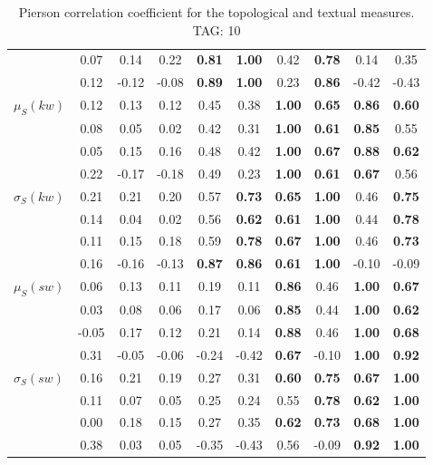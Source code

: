 \begin{table*}[h!]
\begin{center}
\begin{tabular}{| l || c | c | c | c | c | c | c | c | c |}
 & 0.07 & 0.14 & 0.22 & {\bf 0.81} & {\bf 1.00} & 0.42 & {\bf 0.78} & 0.14 & 0.35 \\
 & 0.12 & -0.12 & -0.08 & {\bf 0.89} & {\bf 1.00} & 0.23 & {\bf 0.86} & -0.42 & -0.43 \\\hline
$\mu_S(kw)$ & 0.12 & 0.13 & 0.12 & 0.45 & 0.38 & {\bf 1.00} & {\bf 0.65} & {\bf 0.86} & {\bf 0.60} \\
 & 0.08 & 0.05 & 0.02 & 0.42 & 0.31 & {\bf 1.00} & {\bf 0.61} & {\bf 0.85} & 0.55 \\
 & 0.05 & 0.15 & 0.16 & 0.48 & 0.42 & {\bf 1.00} & {\bf 0.67} & {\bf 0.88} & {\bf 0.62} \\
 & 0.22 & -0.17 & -0.18 & 0.49 & 0.23 & {\bf 1.00} & {\bf 0.61} & {\bf 0.67} & 0.56 \\\hline
$\sigma_S(kw)$ & 0.21 & 0.21 & 0.20 & 0.57 & {\bf 0.73} & {\bf 0.65} & {\bf 1.00} & 0.46 & {\bf 0.75} \\
 & 0.14 & 0.04 & 0.02 & 0.56 & {\bf 0.62} & {\bf 0.61} & {\bf 1.00} & 0.44 & {\bf 0.78} \\
 & 0.11 & 0.15 & 0.18 & 0.59 & {\bf 0.78} & {\bf 0.67} & {\bf 1.00} & 0.46 & {\bf 0.73} \\
 & 0.16 & -0.16 & -0.13 & {\bf 0.87} & {\bf 0.86} & {\bf 0.61} & {\bf 1.00} & -0.10 & -0.09 \\\hline
$\mu_S(sw)$ & 0.06 & 0.13 & 0.11 & 0.19 & 0.11 & {\bf 0.86} & 0.46 & {\bf 1.00} & {\bf 0.67} \\
 & 0.03 & 0.08 & 0.06 & 0.17 & 0.06 & {\bf 0.85} & 0.44 & {\bf 1.00} & {\bf 0.62} \\
 & -0.05 & 0.17 & 0.12 & 0.21 & 0.14 & {\bf 0.88} & 0.46 & {\bf 1.00} & {\bf 0.68} \\
 & 0.31 & -0.05 & -0.06 & -0.24 & -0.42 & {\bf 0.67} & -0.10 & {\bf 1.00} & {\bf 0.92} \\\hline
$\sigma_S(sw)$ & 0.16 & 0.21 & 0.19 & 0.27 & 0.31 & {\bf 0.60} & {\bf 0.75} & {\bf 0.67} & {\bf 1.00} \\
 & 0.11 & 0.07 & 0.05 & 0.25 & 0.24 & 0.55 & {\bf 0.78} & {\bf 0.62} & {\bf 1.00} \\
 & 0.00 & 0.18 & 0.15 & 0.27 & 0.35 & {\bf 0.62} & {\bf 0.73} & {\bf 0.68} & {\bf 1.00} \\
 & 0.38 & 0.03 & 0.05 & -0.35 & -0.43 & 0.56 & -0.09 & {\bf 0.92} & {\bf 1.00} \\\hline
\end{tabular}
\caption{Pierson correlation coefficient for the topological and textual measures. TAG: 10}
\end{center}
\end{table*}